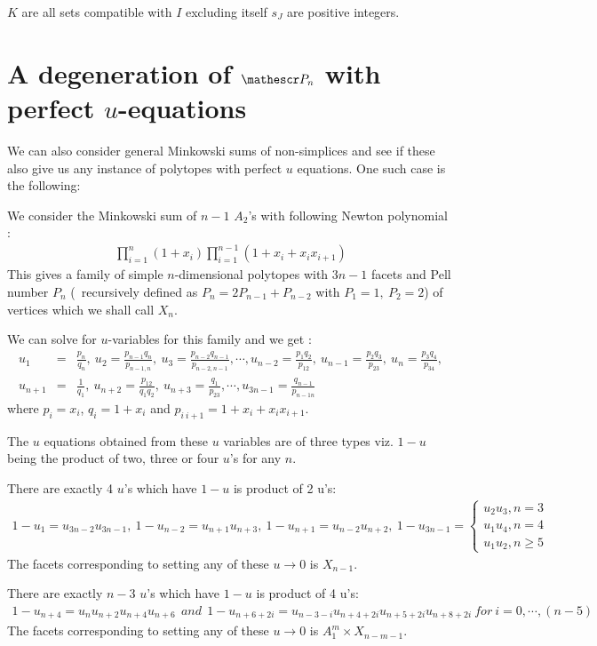 \documentclass[hidelinks,12pt]{article}
\newcommand{\bea}[1]{\begin{eqnarray}\label{#1} }
\newcommand{\eea}{\end{eqnarray}}
\def\bea{\begin{eqnarray}}
\def\eea{\end{eqnarray}}
\begin{document}
 $K$ are all sets compatible with $I$ excluding itself 
 $s_J$ are positive integers. 

 
\section*{A degeneration of ${\mathescr P_n}$ with perfect $u$-equations}
We can also consider general Minkowski sums of non-simplices and see if these also give us any instance of polytopes with perfect $u$ equations. One such case is the following:

We consider the Minkowski sum of $n-1$ $A_2$'s with following Newton polynomial :
\bea \label {new}
\prod_{i=1}^{n} (1+x_i ) \prod_{i=1}^{n-1} (1+x_i +x_i x_{i+1}) 
\eea 
This gives a family of simple $n$-dimensional polytopes with $3n-1$ facets  and Pell number $P_n$ (~recursively defined as $ P_n=2 P_{n-1} +P_{n-2}$ with $P_1=1,~ P_2=2$) of vertices which we shall call $X_n$. 

We can solve for $u$-variables for this family and we get :
\bea
u_1 &=& \frac{p_n}{q_n}, ~u_2 = \frac{p_{n-1}q_n}{p_{n-1,n}},~u_3 = \frac{p_{n-2}q_{n-1}}{p_{n-2,n-1}}, \cdots,
u_{n-2} = \frac{p_1 q_2}{p_{12}}, ~u_{n-1} = \frac{p_{2}q_3}{p_{23}},~u_n = \frac{p_{3}q_{4}}{p_{34}}, \nonumber \\
u_{n+1} &=& \frac{1}{q_1}, ~u_{n+2} = \frac{p_{12}}{q_{1}q_{2}},~u_{n+3} = \frac{q_{1}}{p_{23}}, \cdots,
u_{3n-1} = \frac{ q_{n-1}}{p_{n-1n}} \nonumber
\eea
where $p_i =x_i$, $q_i= 1+x_i$ and $p_{i~i+1}=1+x_i+ x_i x_{i+1}$.

The $u$ equations obtained from these $u$ variables are of three types viz. $1-u$ being the product of two, three or four $u$'s  for any $n$.  

There are exactly 4 $u$'s which have $1-u$ is product of 2 u's:
\bea
1-u_{1} =u_{3n-2} u_{3n-1},~
1-u_{n-2} =u_{n+1} u_{n+3},~
1-u_{n+1} =u_{n-2} u_{n+2},~
1-u_{3n-1} = \begin{cases}
u_{2} u_{3} , n=3\\
u_{1} u_{4} , n=4\\
u_{1} u_{2} , n\geq 5
\end{cases} \nonumber 
\eea
The facets corresponding to setting any of these $u \to 0$ is $X_{n-1}$.

There are exactly $n-3$ $u$'s which have $1-u$ is product of 4 u's:
\bea
1-u_{n+4} =u_{n} u_{n+2}u_{n+4} u_{n+6} ~~and~~
1-u_{n+6+ 2 i} =u_{n-3-i} u_{n+4+2 i} u_{n+5+2 i} u_{n+8+2 i}~ for~i=0,\cdots,(n-5) \nonumber 
\eea
The facets corresponding to setting any of these $u \to 0$ is $A^{m}_1 \times X_{n-m-1}$.
\end{document}
